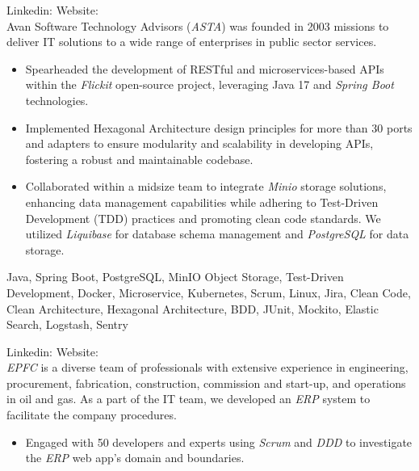 \begin{experiences}
{
  Linkedin: 
  Website: \\
  Avan Software Technology Advisors (\emph{ASTA}) was founded in 2003 missions to deliver IT solutions to a wide range of enterprises in public sector services.
  \begin{itemize}
    \item Spearheaded the development of RESTful and microservices-based APIs within the \emph{Flickit} open-source project, leveraging Java 17 and \emph{Spring Boot} technologies.
    \item Implemented Hexagonal Architecture design principles for more than 30 ports and adapters to ensure modularity and scalability in developing APIs, fostering a robust and maintainable codebase.
    \item Collaborated within a midsize team to integrate \emph{Minio} storage solutions, enhancing data management capabilities while adhering to Test-Driven Development (TDD) practices and promoting clean code standards. We utilized \emph{Liquibase} for database schema management and \emph{PostgreSQL} for data storage.  \end{itemize}}
    {Java, Spring Boot, PostgreSQL, MinIO Object Storage, Test-Driven Development, Docker, Microservice, Kubernetes, Scrum, Linux, Jira, Clean Code, Clean Architecture, Hexagonal Architecture, BDD, JUnit, Mockito, Elastic Search, Logstash, Sentry}
 \emptySeparator
 {
   Linkedin: 
   Website: \\
   \emph{EPFC} is a diverse team of professionals with extensive experience in engineering, procurement, fabrication, construction, commission and start-up, and operations in oil and gas. As a part of the IT team, we developed an \emph{ERP} system to facilitate the company procedures.
   \begin{itemize}
   \item Engaged with 50 developers and experts using \emph{Scrum} and \emph{DDD} to investigate the \textit{ERP} web app's domain and boundaries.

\end{itemize}}
\end{experiences}
